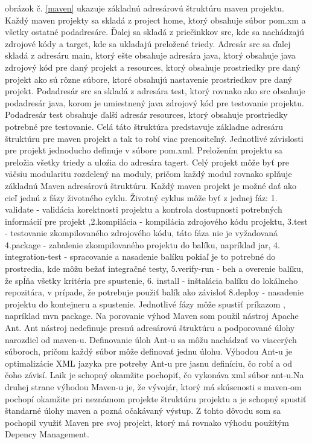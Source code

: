 obrázok č. \ref{maven} ukazuje základnú adresárovú štruktúru maven projektu. Každý maven projekty sa skladá z project home, ktorý obsahuje súbor pom.xm a všetky ostatné podadresáre. Ďalej sa skladá z priečinkkov src, kde sa nachádzajú zdrojové kódy a target, kde sa ukladajú preložené triedy\cite{mavenbook}. Adresár src sa ďalej skladá z adresáru main, ktorý ešte obsahuje adresára java, ktorý obsahuje java zdrojový kód pre daný projekt a resources, ktorý obsahuje prostriedky pre daný projekt ako sú rôzne súbore, ktoré obsahujú nastavenie prostriedkov pre daný projekt. Podadresár src sa skladá z adresára test, ktorý rovnako ako src obsahuje podadresár java, korom je umiestnený java zdrojový kód pre testovanie projektu. Podadresár test obsahuje ďalší adresár resources, ktorý obsahuje prostriedky potrebné pre testovanie. Celá táto štruktúra predstavuje základne adresáru štruktúru pre maven projekt a tak to robí viac prenositeľný. Jednotlivé závislosti pre projekt jednoducho definuje v súbore pom.xml. Preložením projektu sa preložia všetky triedy a uloźia do adresára tagert. Celý projekt môže byť pre väčsiu modularitu rozdelený na moduly, pričom každý modul rovnako splňuje základnú Maven adresárovú štruktúru. Každý maven projekt je možné dať ako cieľ jednú z fázy životného cyklu. Životný cyklus môže byť z jednej fáz: 1. validate - validácia korektnosti projektu a kontrola dostupnosti potrebných informácií pre projekt ,2.kompilácia - kompilácia zdrojového kódu projektu, 3.test - testovanie zkompilovaného zdrojového kódu, táto fáza nie je vyžadovaná 4.package - zabalenie zkompilovaného projektu do balíku, napríklad jar, 4. integration-test - spracovanie a nasadenie balíku pokiaľ je to potrebné do prostredia, kde môžu bežať integračné testy, 5.verify-run - beh a overenie balíku, že spĺňa všetky kritéria pre spustenie, 6. install - inštalácia balíku do lokálneho repozitára, v prípade, že potrebuje použiť balík ako závisloť 8.deploy - nasadenie projektu do kontejneru a spustenie.
Jednotlivé fázy môže spustiť príkazom , napríklad mvn package. Na porovanie výhod Maven som použil nástroj Apache Ant. Ant nástroj nedefinuje presnú adresárovú štruktúru a podporované úlohy narozdiel od maven-u. Definovanie úloh Ant-u sa môžu nachádzať vo viacerých súboroch, pričom každý súbor môže definovať jednu úlohu. Výhodou Ant-u je optimalizácie XML jazyka pre potreby Ant-u pre jasnu definíciu, čo robí a od čoho závisí. Laik je schopný okamžite pochopiť, čo vykonáva xml súbor ant-u.Na druhej strane výhodou Maven-u je, že vývojár, ktorý má skúsenosti s maven-om pochopí okamžite pri neznámom projekte štruktúru projektu a je schopný spustiť štandarné úlohy maven a pozná očakávaný výstup. Z tohto dôvodu som sa pochopil využiť Maven pre svoj projekt, ktorý má rovnako výhodu použítým Depency Management.


